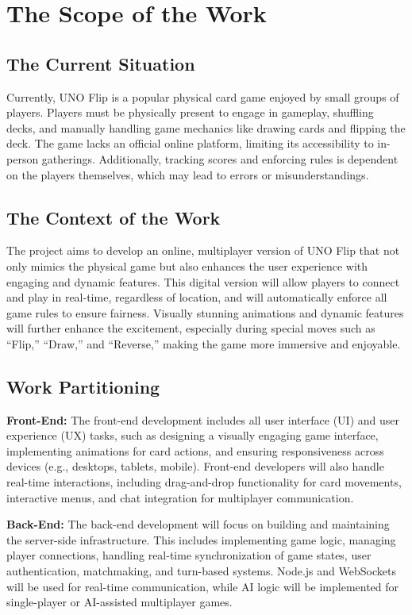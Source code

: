\documentclass{article}
\begin{document}
\section{The Scope of the Work}

\subsection{The Current Situation}
Currently, UNO Flip is a popular physical card game enjoyed by small groups of players. Players must be physically present to engage in gameplay, shuffling decks, and manually handling game mechanics like drawing cards and flipping the deck. The game lacks an official online platform, limiting its accessibility to in-person gatherings. Additionally, tracking scores and enforcing rules is dependent on the players themselves, which may lead to errors or misunderstandings.

\subsection{The Context of the Work}
The project aims to develop an online, multiplayer version of UNO Flip that not only mimics the physical game but also enhances the user experience with engaging and dynamic features. This digital version will allow players to connect and play in real-time, regardless of location, and will automatically enforce all game rules to ensure fairness. Visually stunning animations and dynamic features will further enhance the excitement, especially during special moves such as “Flip,” “Draw,” and “Reverse,” making the game more immersive and enjoyable.

\subsection{Work Partitioning}

\textbf{Front-End:} The front-end development includes all user interface (UI) and user experience (UX) tasks, such as designing a visually engaging game interface, implementing animations for card actions, and ensuring responsiveness across devices (e.g., desktops, tablets, mobile). Front-end developers will also handle real-time interactions, including drag-and-drop functionality for card movements, interactive menus, and chat integration for multiplayer communication.

\textbf{Back-End:} The back-end development will focus on building and maintaining the server-side infrastructure. This includes implementing game logic, managing player connections, handling real-time synchronization of game states, user authentication, matchmaking, and turn-based systems. Node.js and WebSockets will be used for real-time communication, while AI logic will be implemented for single-player or AI-assisted multiplayer games.
\end{document}
